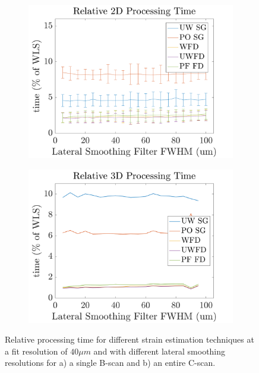 \begin{figure}[th!]
	\centering
    \begin{subfigure}{0.49\textwidth}
    	\centering
        \includegraphics[width=\textwidth]{figures/2d_relative_lr.png}
    \end{subfigure}
    \begin{subfigure}{0.49\textwidth}
    	\centering
        \includegraphics[width=\textwidth]{figures/3d_relative_lr.png}
    \end{subfigure}
    \caption{Relative processing time for different strain estimation techniques at a fit resolution of $40\mu m$ and with different lateral smoothing resolutions for a) a single B-scan and b) an entire C-scan.}
    \label{process_time_2}
\end{figure}


